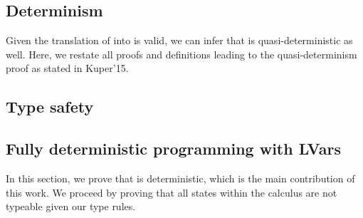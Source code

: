 \documentclass[main.tex]{subfiles}
\begin{document}
\subsection{Determinism}

Given the translation of \typedlvar \mspc into \lvar \mspc is valid, we can infer that
\typedlvar \mspc is quasi-deterministic as well. Here, we restate all proofs and
definitions leading to the quasi-determinism proof as stated in Kuper'15.










\subsection{Type safety}




\subsection{Fully deterministic programming with LVars}

In this section, we prove that \typedlvar \mspc is deterministic, which is the main
contribution of this work. We proceed by proving that all \lvarerror \mspc states
within the \typedlvar calculus are not typeable given our type rules.

\end{document}
